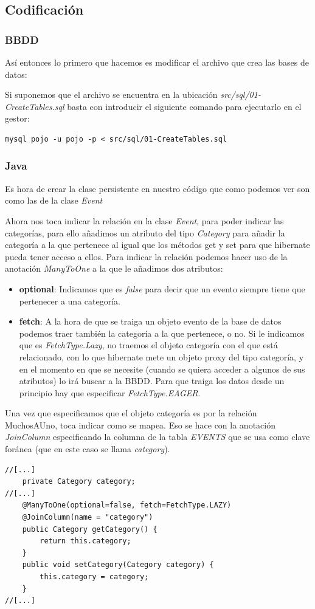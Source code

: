 \documentclass{article}
\begin{document}
\subsection{Codificación}

\subsubsection{BBDD}
	Así entonces lo primero que hacemos es modificar el archivo que crea las bases de datos:


	Si suponemos que el archivo se encuentra en la ubicación \emph{src/sql/01-CreateTables.sql} basta con introducir el siguiente comando para ejecutarlo en el gestor:
\begin{lstlisting}[style=bash]
 mysql pojo -u pojo -p < src/sql/01-CreateTables.sql
\end{lstlisting}

\subsubsection{Java}
	Es hora de crear la clase persistente en nuestro código que como podemos ver son como las de la clase \emph{Event}


	Ahora nos toca indicar la relación en la clase \emph{Event}, para poder indicar las categorías, para ello añadimos un atributo del tipo \emph{Category} para añadir la categoría a la que pertenece al igual que los métodos get y set para que hibernate pueda tener acceso a ellos. Para indicar la relación podemos hacer uso de la anotación \emph{ManyToOne} a la que le añadimos dos atributos:
{\setlength{\parskip}{0mm}
\begin{itemize}
	\item \textbf{optional}: Indicamos que es \emph{false} para decir que un evento siempre tiene que pertenecer a una categoría.
	\item \textbf{fetch}: A la hora de que se traiga un objeto evento de la base de datos podemos traer también la categoría a la que pertenece, o no. Si le indicamos que es \emph{FetchType.Lazy}, no traemos el objeto categoría con el que está relacionado, con lo que hibernate mete un objeto proxy del tipo categoría, y en el momento en que se necesite (cuando se quiera acceder a algunos de sus atributos) lo irá buscar a la BBDD. Para que traiga los datos desde un principio hay que especificar \emph{FetchType.EAGER}.
\end{itemize}
}
Una vez que especificamos que el objeto categoría es por la relación MuchosAUno, toca indicar como se mapea. Eso se hace con la anotación \emph{JoinColumn} especificando la columna de la tabla \emph{EVENTS} que se usa como clave foránea (que en este caso se llama \emph{category}).
\begin{lstlisting}[style=java]
//[...]
	private Category category;
//[...]
	@ManyToOne(optional=false, fetch=FetchType.LAZY)
	@JoinColumn(name = "category")
	public Category getCategory() {
		return this.category;
	}
	public void setCategory(Category category) {
		this.category = category;
	}
//[...]
\end{lstlisting}
\end{document}
